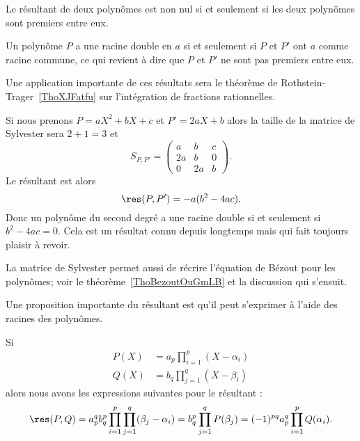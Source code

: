\begin{proposition} \label{PropAPxzcUl}
    Le résultant de deux polynômes est non nul si et seulement si les deux polynômes sont premiers entre eux.
\end{proposition}

Un polynôme \( P\) a une racine double en \( a\) si et seulement si \( P\) et \( P'\) ont \( a\) comme racine commune, ce qui revient à dire que \( P\) et \( P'\) ne sont pas premiers entre eux.

Une application importante de ces résultats sera le théorème de Rothstein-Trager~\ref{ThoXJFatfu} sur l'intégration de fractions rationnelles.

\begin{example}
    Si nous prenons \( P=aX^2+bX+c\) et \( P'=2aX+b\) alors la taille de la matrice de Sylvester sera \( 2+1=3\) et
    \begin{equation}
        S_{P,P'}=\begin{pmatrix}
              a  &   b    &   c    \\
            2a    &   b    &   0    \\
            0    &   2a    &   b
        \end{pmatrix}.
    \end{equation}
    Le résultant est alors
    \begin{equation}
        \res(P,P')=-a(b^2-4ac).
    \end{equation}
    Donc un polynôme du second degré a une racine double si et seulement si \( b^2-4ac=0\). Cela est un résultat connu depuis longtemps mais qui fait toujours plaisir à revoir.
\end{example}

La matrice de Sylvester permet aussi de récrire l'équation de Bézout pour les polynômes; voir le théorème~\ref{ThoBezoutOuGmLB} et la discussion qui s'ensuit.

Une proposition importante du résultant est qu'il peut s'exprimer à l'aide des racines des polynômes.
\begin{proposition} \label{PropNDBOGNx}
    Si
    \begin{subequations}
        \begin{align}
        P(X)&=a_p\prod_{i=1}^p(X-\alpha_i)\\
        Q(X)&=b_q\prod_{j=1}^q(X-\beta_i)
        \end{align}
    \end{subequations}
    alors nous avons les expressions suivantes pour le résultant :
    \begin{equation}        \label{EqCFUumjx}
        \res(P,Q)=a_p^qb_q^p\prod_{i=1}^p\prod_{j=1}^q(\beta_j-\alpha_i)=b_q^p\prod_{j=1}^qP(\beta_j)=(-1)^{pq}a_p^q\prod_{i=1}^pQ(\alpha_i).
    \end{equation}
\end{proposition}


